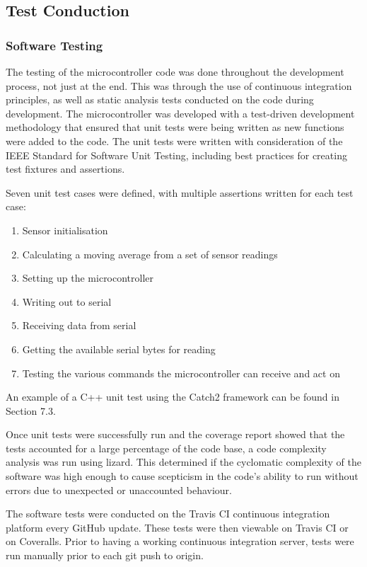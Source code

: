 \documentclass[12pt]{article}
\begin{document}
\subsection{Test Conduction}
\subsubsection{Software Testing}
The testing of the microcontroller code was done throughout the development process, not just at the end. This was through the use of continuous integration principles, as well as static analysis tests conducted on the code during development. The microcontroller was developed with a test-driven development methodology that ensured that unit tests were being written as new functions were added to the code. The unit tests were written with consideration of the IEEE Standard for Software Unit Testing, including best practices for creating test fixtures and assertions.

Seven unit test cases were defined, with multiple assertions written for each test case:
\begin{enumerate}
    \item Sensor initialisation
    \item Calculating a moving average from a set of sensor readings
    \item Setting up the microcontroller
    \item Writing out to serial
    \item Receiving data from serial
    \item Getting the available serial bytes for reading
    \item Testing the various commands the microcontroller can receive and act on
\end{enumerate}

An example of a C++ unit test using the Catch2 framework can be found in Section 7.3.

Once unit tests were successfully run and the coverage report showed that the tests accounted for a large percentage of the code base, a code complexity analysis was run using lizard. This determined if the cyclomatic complexity of the software was high enough to cause scepticism in the code's ability to run without errors due to unexpected or unaccounted behaviour.

The software tests were conducted on the Travis CI continuous integration platform every GitHub update. These tests were then viewable on Travis CI or on Coveralls. Prior to having a working continuous integration server, tests were run manually prior to each git push to origin.
\end{document}
